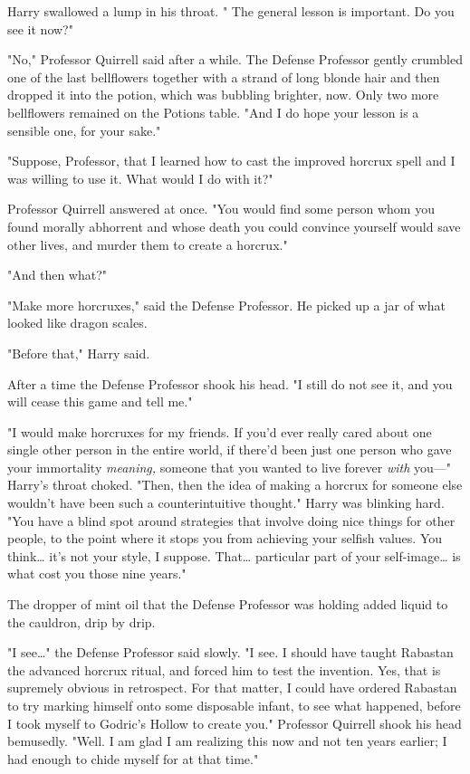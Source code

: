 Harry swallowed a lump in his throat. " The general lesson is important. Do you
see it now?"

"No," Professor Quirrell said after a while. The Defense Professor gently
crumbled one of the last bellflowers together with a strand of long blonde hair
and then dropped it into the potion, which was bubbling brighter, now. Only two
more bellflowers remained on the Potions table. "And I do hope your lesson is a
sensible one, for your sake."

"Suppose, Professor, that I learned how to cast the improved horcrux spell and
I was willing to use it. What would I do with it?"

Professor Quirrell answered at once. "You would find some person whom you found
morally abhorrent and whose death you could convince yourself would save other
lives, and murder them to create a horcrux."

"And then what?"

"Make more horcruxes," said the Defense Professor. He picked up a jar of what
looked like dragon scales.

"Before that," Harry said.

After a time the Defense Professor shook his head. "I still do not see it, and
you will cease this game and tell me."

"I would make horcruxes for my friends. If you'd ever really cared about one
single other person in the entire world, if there'd been just one person who
gave your immortality \emph{meaning,} someone that you wanted to live forever
\emph{with} you---" Harry's throat choked. "Then, then the idea of making a
horcrux for someone else wouldn't have been such a counterintuitive thought."
Harry was blinking hard. "You have a blind spot around strategies that involve
doing nice things for other people, to the point where it stops you from
achieving your selfish values. You think{\ldots} it's not your style, I
suppose. That{\ldots} particular part of your self-image{\ldots} is what cost
you those nine years."

The dropper of mint oil that the Defense Professor was holding added liquid to
the cauldron, drip by drip.

"I see{\ldots}" the Defense Professor said slowly. "I see. I should have taught
Rabastan the advanced horcrux ritual, and forced him to test the invention.
Yes, that is supremely obvious in retrospect. For that matter, I could have
ordered Rabastan to try marking himself onto some disposable infant, to see
what happened, before I took myself to Godric's Hollow to create you."
Professor Quirrell shook his head bemusedly. "Well. I am glad I am realizing
this now and not ten years earlier; I had enough to chide myself for at that
time."

